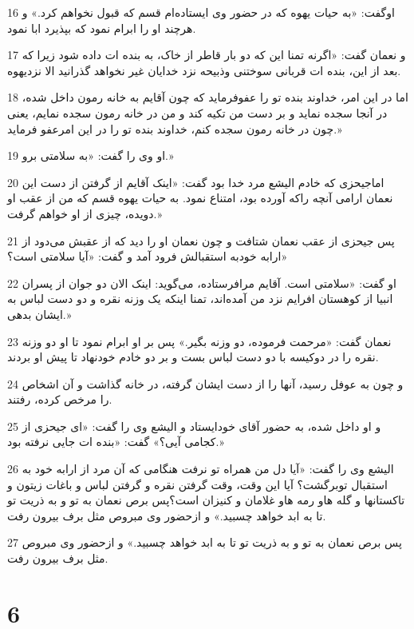 \par 16 اوگفت: «به حیات یهوه که در حضور وی ایستاده‌ام قسم که قبول نخواهم کرد.» و هرچند او را ابرام نمود که بپذیرد ابا نمود.
\par 17 و نعمان گفت: «اگرنه تمنا این که دو بار قاطر از خاک، به بنده ات داده شود زیرا که بعد از این، بنده ات قربانی سوختنی وذبیحه نزد خدایان غیر نخواهد گذرانید الا نزدیهوه.
\par 18 اما در این امر، خداوند بنده تو را عفوفرماید که چون آقایم به خانه رمون داخل شده، در آنجا سجده نماید و بر دست من تکیه کند و من در خانه رمون سجده نمایم، یعنی چون در خانه رمون سجده کنم، خداوند بنده تو را در این امرعفو فرماید.»
\par 19 او وی را گفت: «به سلامتی برو.»
\par 20 اماجیحزی که خادم الیشع مرد خدا بود گفت: «اینک آقایم از گرفتن از دست این نعمان ارامی آنچه راکه آورده بود، امتناع نمود. به حیات یهوه قسم که من از عقب او دویده، چیزی از او خواهم گرفت.»
\par 21 پس جیحزی از عقب نعمان شتافت و چون نعمان او را دید که از عقبش می‌دود از ارابه خودبه استقبالش فرود آمد و گفت: «آیا سلامتی است؟»
\par 22 او گفت: «سلامتی است. آقایم مرافرستاده، می‌گوید: اینک الان دو جوان از پسران انبیا از کوهستان افرایم نزد من آمده‌اند، تمنا اینکه یک وزنه نقره و دو دست لباس به ایشان بدهی.»
\par 23 نعمان گفت: «مرحمت فرموده، دو وزنه بگیر.» پس بر او ابرام نمود تا او دو وزنه نقره را در دوکیسه با دو دست لباس بست و بر دو خادم خودنهاد تا پیش او بردند.
\par 24 و چون به عوفل رسید، آنها را از دست ایشان گرفته، در خانه گذاشت و آن اشخاص را مرخص کرده، رفتند.
\par 25 و او داخل شده، به حضور آقای خودایستاد و الیشع وی را گفت: «ای جیحزی از کجامی آیی؟» گفت: «بنده ات جایی نرفته بود.»
\par 26 الیشع وی را گفت: «آیا دل من همراه تو نرفت هنگامی که آن مرد از ارابه خود به استقبال توبرگشت؟ آیا این وقت، وقت گرفتن نقره و گرفتن لباس و باغات زیتون و تاکستانها و گله هاو رمه هاو غلامان و کنیزان است؟پس برص نعمان به تو و به ذریت تو تا به ابد خواهد چسبید.» و ازحضور وی مبروص مثل برف بیرون رفت.
\par 27 پس برص نعمان به تو و به ذریت تو تا به ابد خواهد چسبید.» و ازحضور وی مبروص مثل برف بیرون رفت.
 
\chapter{6}

